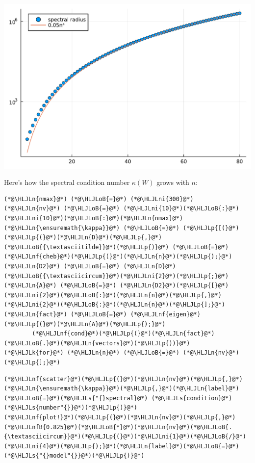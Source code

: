 \documentclass[12pt,a4paper]{article}
\newcommand{\HLJLk}[1]{\textcolor[RGB]{148,91,176}{\textbf{#1}}}
\newcommand{\HLJLn}[1]{#1}
\newcommand{\HLJLnf}[1]{\textcolor[RGB]{66,102,213}{#1}}
\newcommand{\HLJLs}[1]{\textcolor[RGB]{201,61,57}{#1}}
\newcommand{\HLJLnfB}[1]{\textcolor[RGB]{59,151,46}{#1}}
\newcommand{\HLJLni}[1]{\textcolor[RGB]{59,151,46}{#1}}
\newcommand{\HLJLoB}[1]{\textcolor[RGB]{102,102,102}{\textbf{#1}}}
\newcommand{\HLJLp}[1]{#1}
\begin{document}
\includegraphics[width=\linewidth]{jl_Vz6qXN/Chapter5_46_1.pdf}

Here's how the spectral condition number $\kappa(W)$ grows with $n$:


\begin{lstlisting}
(*@\HLJLn{nmax}@*) (*@\HLJLoB{=}@*) (*@\HLJLni{300}@*)
(*@\HLJLn{nv}@*) (*@\HLJLoB{=}@*) (*@\HLJLni{10}@*)(*@\HLJLoB{:}@*)(*@\HLJLni{10}@*)(*@\HLJLoB{:}@*)(*@\HLJLn{nmax}@*)
(*@\HLJLn{\ensuremath{\kappa}}@*) (*@\HLJLoB{=}@*) (*@\HLJLp{[(}@*) (*@\HLJLp{(}@*)(*@\HLJLn{D}@*)(*@\HLJLp{,}@*)(*@\HLJLoB{{\textasciitilde}}@*)(*@\HLJLp{)}@*) (*@\HLJLoB{=}@*) (*@\HLJLnf{cheb}@*)(*@\HLJLp{(}@*)(*@\HLJLn{n}@*)(*@\HLJLp{);}@*) (*@\HLJLn{D2}@*) (*@\HLJLoB{=}@*) (*@\HLJLn{D}@*)(*@\HLJLoB{{\textasciicircum}}@*)(*@\HLJLni{2}@*)(*@\HLJLp{;}@*) (*@\HLJLn{A}@*) (*@\HLJLoB{=}@*) (*@\HLJLn{D2}@*)(*@\HLJLp{[}@*)(*@\HLJLni{2}@*)(*@\HLJLoB{:}@*)(*@\HLJLn{n}@*)(*@\HLJLp{,}@*)(*@\HLJLni{2}@*)(*@\HLJLoB{:}@*)(*@\HLJLn{n}@*)(*@\HLJLp{];}@*) (*@\HLJLn{fact}@*) (*@\HLJLoB{=}@*) (*@\HLJLnf{eigen}@*)(*@\HLJLp{(}@*)(*@\HLJLn{A}@*)(*@\HLJLp{);}@*)
        (*@\HLJLnf{cond}@*)(*@\HLJLp{(}@*)(*@\HLJLn{fact}@*)(*@\HLJLoB{.}@*)(*@\HLJLn{vectors}@*)(*@\HLJLp{))}@*) (*@\HLJLk{for}@*) (*@\HLJLn{n}@*) (*@\HLJLoB{=}@*) (*@\HLJLn{nv}@*)(*@\HLJLp{];}@*)
\end{lstlisting}


\begin{lstlisting}
(*@\HLJLnf{scatter}@*)(*@\HLJLp{(}@*)(*@\HLJLn{nv}@*)(*@\HLJLp{,}@*)(*@\HLJLn{\ensuremath{\kappa}}@*)(*@\HLJLp{,}@*)(*@\HLJLn{label}@*)(*@\HLJLoB{=}@*)(*@\HLJLs{"{}spectral}@*) (*@\HLJLs{condition}@*) (*@\HLJLs{number"{}}@*)(*@\HLJLp{)}@*)
(*@\HLJLnf{plot!}@*)(*@\HLJLp{(}@*)(*@\HLJLn{nv}@*)(*@\HLJLp{,}@*)(*@\HLJLnfB{0.825}@*)(*@\HLJLoB{*}@*)(*@\HLJLn{nv}@*)(*@\HLJLoB{.{\textasciicircum}}@*)(*@\HLJLp{(}@*)(*@\HLJLni{1}@*)(*@\HLJLoB{/}@*)(*@\HLJLni{4}@*)(*@\HLJLp{);}@*)(*@\HLJLn{label}@*)(*@\HLJLoB{=}@*)(*@\HLJLs{"{}model"{}}@*)(*@\HLJLp{)}@*)
\end{lstlisting}
\end{document}
